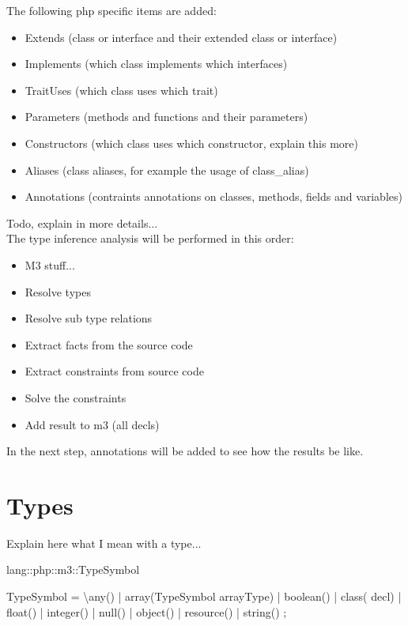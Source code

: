 \documentclass[../main.tex]{subfiles}
\begin{document}
    The following php specific items are added:
    \begin{itemize}
        \item Extends (class or interface and their extended class or interface)
        \item Implements (which class implements which interfaces)
        \item TraitUses (which class uses which trait)
        \item Parameters (methods and functions and their parameters)
        \item Constructors (which class uses which constructor, explain this more)
        \item Aliases (class aliases, for example the usage of class\_{}alias)
        \item Annotations (contraints annotations on classes, methods, fields and variables)
    \end{itemize}
    Todo, explain in more details...
    \\
    The type inference analysis will be performed in this order:
    \begin{itemize}
        \item M3 stuff...
        \item Resolve types
        \item Resolve sub type relations
        \item Extract facts from the source code
        \item Extract constraints from source code
        \item Solve the constraints
        \item Add result to m3 (all decls)
    \end{itemize}
    In the next step, annotations will be added to see how the results be like.

    \section{Types}
    Explain here what I mean with a type...
    
    \begin{rascal}
 lang::php::m3::TypeSymbol

 TypeSymbol
  = \textbackslash{}any()        | array(TypeSymbol arrayType)
  | boolean()     | class( decl)
  | float()       | integer()
  | null()        | object()
  | resource()    | string()
  ;
    \end{rascal}
    
\end{document}
